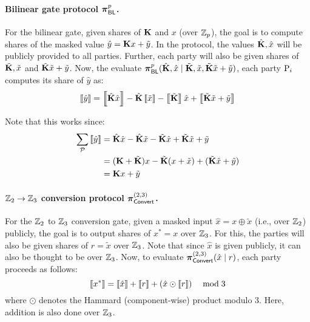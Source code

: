

\paragraph{Bilinear gate protocol $\boldsymbol{\pi}_{\textsf{BL}}^p$.}
For the bilinear gate, given shares of $\mat{K}$ and $x$ (over $\mathbb{Z}_p$), the goal is to compute shares of the masked value $\hat{y} = \mat{K}x + \tilde{y}$. In the protocol, the values $\hat{\mat{K}}, \hat{x}$ will be publicly provided to all parties. Further, each party will also be given shares of $\tilde{\mat{K}}, \tilde{x}$ and $\tilde{\mat{K}}\tilde{x} + \tilde{y}$. Now, the evaluate $\prot_\BLMap^p(\hat{\mat{K}},\hat{x}\mid \tilde{\mat{K}}, \tilde{x}, \tilde{\mat{K}}\tilde{x} + \tilde{y})$, each party $\textnormal{P}_i$ computes its share of $\hat{y}$ as:
\[
    \share{\hat{y}} = \share{\hat{\mat{K}}\hat{x}} - \hat{\mat{K}}\share{\tilde{x}} - \share{\tilde{\mat{K}}}\hat{x} + \share{\tilde{\mat{K}}\tilde{x} + \tilde{y}}
\]

\noindent Note that this works since:
\begin{align*}
\sum_\parties \share{\hat{y}} &= \hat{\mat{K}}\hat{x} - \hat{\mat{K}}\tilde{x} - \tilde{\mat{K}}\hat{x} + \tilde{\mat{K}}\tilde{x} + \tilde{y} \\
&= (\mat{K} + \tilde{\mat{K}})x - \tilde{\mat{K}}(x + \tilde{x}) + (\tilde{\mat{K}}\tilde{x} + \tilde{y}) \\
&= \mat{K}x + \tilde{y}
\end{align*}

\paragraph{$\mathbb{Z}_2 \to \mathbb{Z}_3$ conversion protocol $\boldsymbol{\pi}_{\textsf{Convert}}^{(2,3)}$.}
For the $\mathbb{Z}_2$ to $\mathbb{Z}_3$ conversion gate, given a masked input $\hat{x} = x \oplus \tilde{x}$ (i.e., over $\mathbb{Z}_2$) publicly, the goal is to output shares of $x^* = x$ over $\mathbb{Z}_3$. For this, the parties will also be given shares of $r = \tilde{x}$ over $\mathbb{Z}_3$. Note that since $\hat{x}$ is given publicly, it can also be thought to be over $\mathbb{Z}_3$. Now, to evaluate $\boldsymbol{\pi}_{\textsf{Convert}}^{(2,3)}(\hat{x} \mid r)$, each party proceeds as follows:
\[
\left\llbracket x^* \right\rrbracket = \left\llbracket \hat{x} \right\rrbracket + \left\llbracket r \right\rrbracket + (\hat{x} \odot \left\llbracket r \right\rrbracket) \quad \bmod 3
\]
where $\odot$ denotes the Hammard (component-wise) product modulo 3. Here, addition is also done over $\mathbb{Z}_3$. \\


